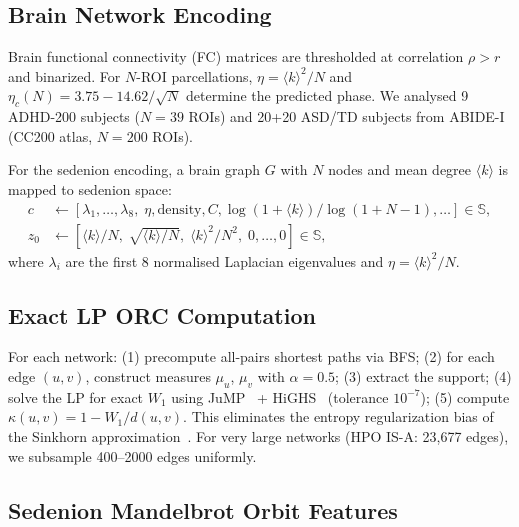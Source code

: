 \documentclass[11pt,a4paper]{article}
\newcommand{\kavg}{\langle k \rangle}
\newcommand{\etac}{\eta_c}
\begin{document}
\subsection{Brain Network Encoding}
\label{sec:brain_encoding}

Brain functional connectivity (FC) matrices are thresholded at correlation $\rho > r$ and binarized. For $N$-ROI parcellations, $\eta = \kavg^2/N$ and $\etac(N) = 3.75 - 14.62/\sqrt{N}$ determine the predicted phase. We analysed 9 ADHD-200 subjects ($N=39$ ROIs) and 20+20 ASD/TD subjects from ABIDE-I (CC200 atlas, $N=200$ ROIs).

For the sedenion encoding, a brain graph $G$ with $N$ nodes and mean degree $\kavg$ is mapped to sedenion space:
\begin{align}
c &\leftarrow [\lambda_1,\ldots,\lambda_8,\; \eta, \text{density}, C, \log(1{+}\kavg)/\log(1{+}N{-}1), \ldots] \in \mathbb{S}, \\
z_0 &\leftarrow [\kavg/N,\; \sqrt{\kavg/N},\; \kavg^2/N^2,\; 0,\ldots,0] \in \mathbb{S},
\end{align}
where $\lambda_i$ are the first 8 normalised Laplacian eigenvalues and $\eta = \kavg^2/N$.

\subsection{Exact LP ORC Computation}

For each network: (1) precompute all-pairs shortest paths via BFS; (2) for each edge $(u,v)$, construct measures $\mu_u$, $\mu_v$ with $\alpha=0.5$; (3) extract the support; (4) solve the LP for exact $W_1$ using JuMP~\cite{dunning2017jump} + HiGHS~\cite{huber2024highs} (tolerance $10^{-7}$); (5) compute $\kappa(u,v) = 1 - W_1/d(u,v)$. This eliminates the entropy regularization bias of the Sinkhorn approximation~\cite{cuturi2013sinkhorn}. For very large networks (HPO IS-A: 23,677 edges), we subsample 400--2000 edges uniformly.

\subsection{Sedenion Mandelbrot Orbit Features}
\label{sec:sedenion_features}
\end{document}
